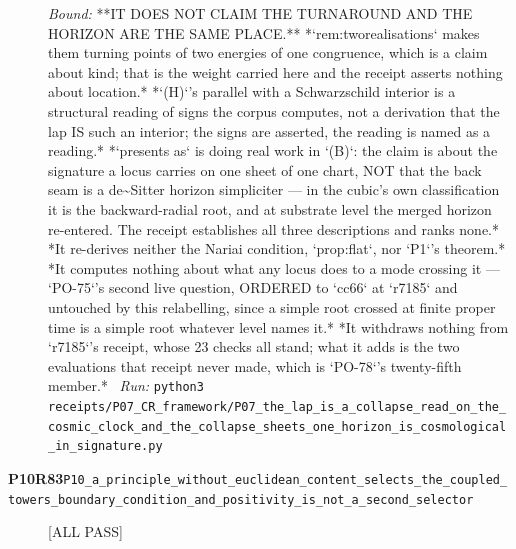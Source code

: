 \begin{description}
 \emph{Bound:}  **IT DOES NOT CLAIM THE TURNAROUND AND THE HORIZON ARE THE SAME PLACE.** *`rem:tworealisations` makes them turning points of two energies of one congruence, which is a claim about kind; that is the weight carried here and the receipt asserts nothing about location.*  *`(H)`'s parallel with a Schwarzschild interior is a structural reading of signs the corpus computes, not a derivation that the lap IS such an interior; the signs are asserted, the reading is named as a reading.*  *`presents as` is doing real work in `(B)`: the claim is about the signature a locus carries on one sheet of one chart, NOT that the back seam is a de\textasciitilde{}Sitter horizon simpliciter --- in the cubic's own classification it is the backward-radial root, and at substrate level the merged horizon re-entered. The receipt establishes all three descriptions and ranks none.*  *It re-derives neither the Nariai condition, `prop:flat`, nor `P1`'s theorem.*  *It computes nothing about what any locus does to a mode crossing it --- `PO-75`'s second live question, ORDERED to `cc66` at `r7185` and untouched by this relabelling, since a simple root crossed at finite proper time is a simple root whatever level names it.*  *It withdraws nothing from `r7185`'s receipt, whose 23 checks all stand; what it adds is the two evaluations that receipt never made, which is `PO-78`'s twenty-fifth member.*
\ \emph{Run:} \texttt{python3 receipts/P07\_CR\_framework/P07\_the\_lap\_is\_a\_collapse\_read\_on\_the\_cosmic\_clock\_and\_the\_collapse\_sheets\_one\_horizon\_is\_cosmological\_in\_signature.py}
\item[\rcptlabel{P10_a_principle_without_euclidean_content_selects_the_coupled_towers_boundary_condition_and_positivity_is_not_a_second_selector}{P10R83}\textbf{P10R83}\quad\texttt{P10\_a\_principle\_without\_euclidean\_content\_selects\_the\_coupled\_towers\_boundary\_condition\_and\_positivity\_is\_not\_a\_second\_selector}]\hfill\textsf{[ALL PASS]}\\

\end{description}
